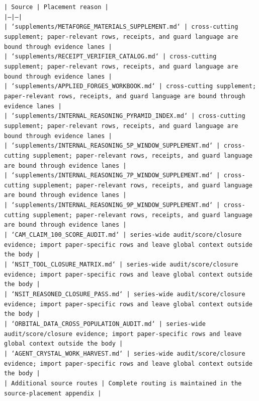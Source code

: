 \documentclass[11pt]{article}
\begin{document}
\noindent\texttt{| Source | Placement reason |}\\
\noindent\texttt{|---|---|}\\
\noindent\texttt{| `supplements/METAFORGE\_MATERIALS\_SUPPLEMENT.md` | cross-cutting supplement; paper-relevant rows, receipts, and guard language are bound through evidence lanes |}\\
\noindent\texttt{| `supplements/RECEIPT\_VERIFIER\_CATALOG.md` | cross-cutting supplement; paper-relevant rows, receipts, and guard language are bound through evidence lanes |}\\
\noindent\texttt{| `supplements/APPLIED\_FORGES\_WORKBOOK.md` | cross-cutting supplement; paper-relevant rows, receipts, and guard language are bound through evidence lanes |}\\
\noindent\texttt{| `supplements/INTERNAL\_REASONING\_PYRAMID\_INDEX.md` | cross-cutting supplement; paper-relevant rows, receipts, and guard language are bound through evidence lanes |}\\
\noindent\texttt{| `supplements/INTERNAL\_REASONING\_5P\_WINDOW\_SUPPLEMENT.md` | cross-cutting supplement; paper-relevant rows, receipts, and guard language are bound through evidence lanes |}\\
\noindent\texttt{| `supplements/INTERNAL\_REASONING\_7P\_WINDOW\_SUPPLEMENT.md` | cross-cutting supplement; paper-relevant rows, receipts, and guard language are bound through evidence lanes |}\\
\noindent\texttt{| `supplements/INTERNAL\_REASONING\_9P\_WINDOW\_SUPPLEMENT.md` | cross-cutting supplement; paper-relevant rows, receipts, and guard language are bound through evidence lanes |}\\
\noindent\texttt{| `CAM\_CLAIM\_100\_SCORE\_AUDIT.md` | series-wide audit/score/closure evidence; import paper-specific rows and leave global context outside the body |}\\
\noindent\texttt{| `NSIT\_TOOL\_CLOSURE\_MATRIX.md` | series-wide audit/score/closure evidence; import paper-specific rows and leave global context outside the body |}\\
\noindent\texttt{| `NSIT\_REASONED\_CLOSURE\_PASS.md` | series-wide audit/score/closure evidence; import paper-specific rows and leave global context outside the body |}\\
\noindent\texttt{| `ORBITAL\_DATA\_CROSS\_POPULATION\_AUDIT.md` | series-wide audit/score/closure evidence; import paper-specific rows and leave global context outside the body |}\\
\noindent\texttt{| `AGENT\_CRYSTAL\_WORK\_HARVEST.md` | series-wide audit/score/closure evidence; import paper-specific rows and leave global context outside the body |}\\
\noindent\texttt{| Additional source routes | Complete routing is maintained in the source-placement appendix |}\\
\end{document}
